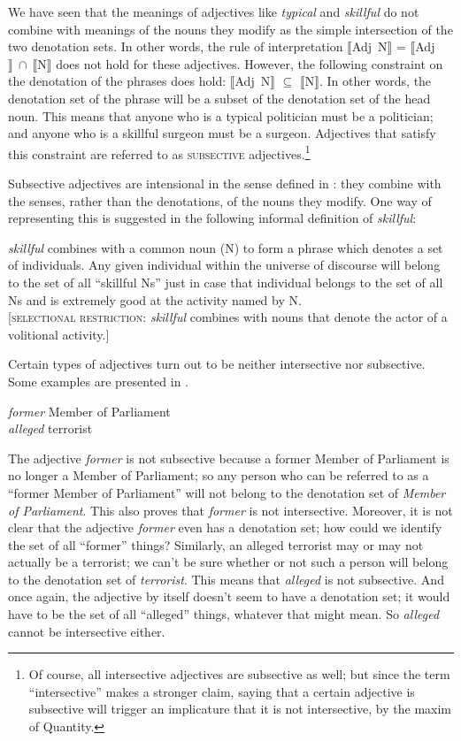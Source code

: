 We have seen that the meanings of adjectives like \textit{typical} and \textit{skillful} do not combine with meanings of the nouns they modify as the simple intersection of the two denotation sets. In other words, the rule of interpretation $\llbracket$Adj~N$\rrbracket$  = $\llbracket$Adj$\rrbracket~{\cap}~\llbracket$N$\rrbracket$  does not hold for these adjectives. However, the following constraint on the denotation of the phrases does hold: $\llbracket$Adj~N$\rrbracket$  ${\subseteq}$ $\llbracket$N$\rrbracket$.  In other words, the denotation set of the phrase will be a subset of the denotation set of the head noun. This means that anyone who is a typical politician must be a politician; and anyone who is a skillful surgeon must be a surgeon. Adjectives that satisfy this constraint are referred to as \textsc{subsective} adjectives.\footnote{Of course, all intersective adjectives are subsective as well; but since the term “intersective” makes a stronger claim, saying that a certain adjective is subsective will trigger an implicature that it is not intersective, by the maxim of Quantity.}



Subsective adjectives are intensional in the sense defined in : they combine with the senses, rather than the denotations, of the nouns they modify. One way of representing this is suggested in the following informal definition of \textit{skillful}:


\eanoraggedright \label{ex:15.9}
\textit{skillful} combines with a common noun (N) to form a phrase which denotes a set of individuals. Any given individual within the universe of discourse will belong to the set of all “skillful Ns” just in case that individual belongs to the set of all Ns and is extremely good at the activity named by N.\\
{}[\textsc{selectional restriction}: \textit{skillful} combines with nouns that denote the actor of a volitional activity.]
\z


Certain types of adjectives turn out to be neither intersective nor subsective. Some examples are presented in .


\ea \label{ex:15.10}
\ea  \textit{former} Member of Parliament\\
\ex \textit{alleged} terrorist
\z \z


The adjective \textit{former} is not subsective because a former Member of Parliament is no longer a Member of Parliament; so any person who can be referred to as a “former Member of Parliament” will not belong to the denotation set of \textit{Member of Parliament}. This also proves that \textit{former} is not intersective. Moreover, it is not clear that the adjective \textit{former} even has a denotation set; how could we identify the set of all “former” things? Similarly, an alleged terrorist may or may not actually be a terrorist; we can’t be sure whether or not such a person will belong to the denotation set of \textit{terrorist}. This means that \textit{alleged} is not subsective. And once again, the adjective by itself doesn’t seem to have a denotation set; it would have to be the set of all “alleged” things, whatever that might mean. So \textit{alleged} cannot be intersective either.



